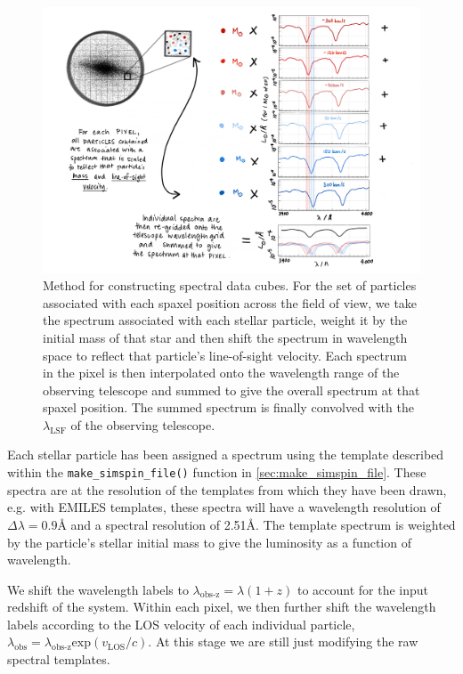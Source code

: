 \documentclass[
  journal=pasa,
  manuscript=research-paper, %
  year=2020,
  volume=37,
]{cup-journal}
\newcommand{\makesimspinfile}[1]{\texttt{make\_simspin\_file()}#1}
\begin{document}
\begin{figure}
    \centering
    \includegraphics[keepaspectratio, width=14cm]{Figures/spectral_velocity_methodology.png}
    \caption{Method for constructing spectral data cubes. For the set of particles associated with each spaxel position across the field of view, we take the spectrum associated with each stellar particle, weight it by the initial mass of that star and then shift the spectrum in wavelength space to reflect that particle's line-of-sight velocity. Each spectrum in the pixel is then interpolated onto the wavelength range of the observing telescope and summed to give the overall spectrum at that spaxel position. The summed spectrum is finally convolved with the $\lambda_{\text{LSF}}$ of the observing telescope.}
    \label{fig:spectral_methodology}
\end{figure}

Each stellar particle has been assigned a spectrum using the template described within the \makesimspinfile{} function in \cref{sec:make_simspin_file}. 
These spectra are at the resolution of the templates from which they have been drawn, e.g. with EMILES templates, these spectra will have a wavelength resolution of $\Delta \lambda = 0.9$\AA{} and a spectral resolution of 2.51\AA.
The template spectrum is weighted by the particle's stellar initial mass to give the luminosity as a function of wavelength.
    
We shift the wavelength labels to $\lambda_{\text{obs-z}} = \lambda (1 + z)$ to account for the input redshift of the system. 
Within each pixel, we then further shift the wavelength labels according to the LOS velocity of each individual particle, $\lambda_{\text{obs}} = \lambda_{\text{obs-z}} \text{exp}(v_{\text{LOS}}/c)$. 
At this stage we are still just modifying the raw spectral templates.
\end{document}
